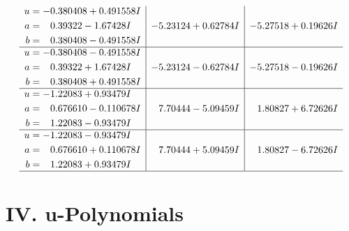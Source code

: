 \documentclass[1p]{elsarticle_modified}
\theoremstyle{definition}
\begin{document}
$$\begin{array}{c|c|c}
\begin{aligned}
u &= -0.380408 + 0.491558 I \\
a &= \phantom{-}0.39322 - 1.67428 I \\
b &= \phantom{-}0.380408 - 0.491558 I\end{aligned}
 & -5.23124 + 0.62784 I & -5.27518 + 0.19626 I \\ \hline\begin{aligned}
u &= -0.380408 - 0.491558 I \\
a &= \phantom{-}0.39322 + 1.67428 I \\
b &= \phantom{-}0.380408 + 0.491558 I\end{aligned}
 & -5.23124 - 0.62784 I & -5.27518 - 0.19626 I \\ \hline\begin{aligned}
u &= -1.22083 + 0.93479 I \\
a &= \phantom{-}0.676610 - 0.110678 I \\
b &= \phantom{-}1.22083 - 0.93479 I\end{aligned}
 & \phantom{-}7.70444 - 5.09459 I & \phantom{-}1.80827 + 6.72626 I \\ \hline\begin{aligned}
u &= -1.22083 - 0.93479 I \\
a &= \phantom{-}0.676610 + 0.110678 I \\
b &= \phantom{-}1.22083 + 0.93479 I\end{aligned}
 & \phantom{-}7.70444 + 5.09459 I & \phantom{-}1.80827 - 6.72626 I\\
 \hline 
 \end{array}$$\newpage
\newpage\renewcommand{\arraystretch}{1}
\centering \section*{ IV. u-Polynomials}
\end{document}
